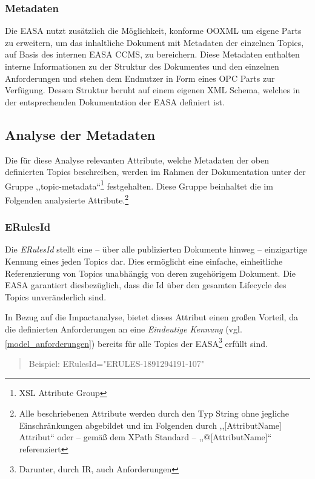             \subsubsection{Metadaten}

    Die \ac{EASA} nutzt zusätzlich die Möglichkeit, konforme \ac{OOXML} um eigene Parts zu erweitern, um das inhaltliche Dokument mit Metadaten der einzelnen Topics, auf Basis des internen \ac{EASA} \ac{CCMS}, zu bereichern.
    Diese Metadaten enthalten interne Informationen zu der Struktur des Dokumentes und den einzelnen Anforderungen und stehen dem Endnutzer in Form eines \ac{OPC} Parts  zur Verfügung.
    Dessen Struktur beruht auf einem eigenen \ac{XML} Schema, welches in der entsprechenden Dokumentation der \ac{EASA} definiert ist.

\pagebreak
\subsection{Analyse der Metadaten}
\label{ch:easa_anal}

    Die für diese Analyse relevanten Attribute, welche Metadaten der oben definierten Topics beschreiben, werden im Rahmen der Dokumentation unter der Gruppe ,,\textsf{topic-metadata}``\footnote{\ac{XSL} Attribute Group} festgehalten.
    Diese Gruppe beinhaltet die im Folgenden analysierte Attribute.\footnote{Alle beschriebenen Attribute werden durch den Typ String ohne jegliche Einschränkungen abgebildet und im Folgenden durch ,,[AttributName] Attribut`` oder -- gemäß dem XPath Standard -- ,,@[AttributName]`` referenziert} \cite[9]{easa_xml_schema}

    \subsubsection{ERulesId}

Die \textit{ERulesId} stellt eine -- über alle publizierten Dokumente hinweg -- einzigartige Kennung eines jeden Topics dar.
Dies ermöglicht eine einfache, einheitliche Referenzierung von Topics unabhängig von deren zugehörigem Dokument.
Die \ac{EASA} garantiert diesbezüglich, dass die Id über den gesamten Lifecycle des Topics unveränderlich sind. \cite[17]{easa_xml_doc}

In Bezug auf die Impactanalyse, bietet dieses Attribut einen großen Vorteil, da die definierten Anforderungen an eine \textit{Eindeutige Kennung} (vgl. \ref{model_anforderungen}) bereits für alle Topics der \ac{EASA}\footnote{Darunter, durch \ac{IR}, auch \atmans Anforderungen} erfüllt sind.
\begin{quote}
Beispiel:
\textsf{ERulesId="{}ERULES-1891294191-107"}
\end{quote}

